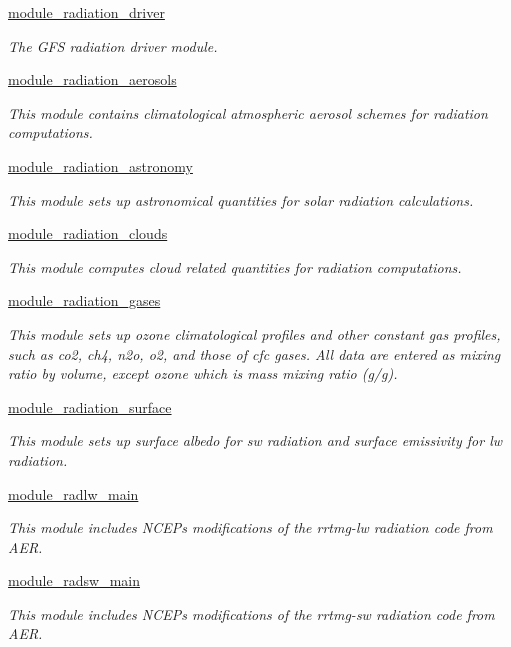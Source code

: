 \begin{DoxyCompactItemize}
\item 
\hyperlink{group__module__radiation__driver}{module\+\_\+radiation\+\_\+driver}
\begin{DoxyCompactList}\small\item\em The G\+FS radiation driver module. \end{DoxyCompactList}\item 
\hyperlink{group__module__radiation__aerosols}{module\+\_\+radiation\+\_\+aerosols}
\begin{DoxyCompactList}\small\item\em This module contains climatological atmospheric aerosol schemes for radiation computations. \end{DoxyCompactList}\item 
\hyperlink{group__module__radiation__astronomy}{module\+\_\+radiation\+\_\+astronomy}
\begin{DoxyCompactList}\small\item\em This module sets up astronomical quantities for solar radiation calculations. \end{DoxyCompactList}\item 
\hyperlink{group__module__radiation__clouds}{module\+\_\+radiation\+\_\+clouds}
\begin{DoxyCompactList}\small\item\em This module computes cloud related quantities for radiation computations. \end{DoxyCompactList}\item 
\hyperlink{group__module__radiation__gases}{module\+\_\+radiation\+\_\+gases}
\begin{DoxyCompactList}\small\item\em This module sets up ozone climatological profiles and other constant gas profiles, such as co2, ch4, n2o, o2, and those of cfc gases. All data are entered as mixing ratio by volume, except ozone which is mass mixing ratio (g/g). \end{DoxyCompactList}\item 
\hyperlink{group__module__radiation__surface}{module\+\_\+radiation\+\_\+surface}
\begin{DoxyCompactList}\small\item\em This module sets up surface albedo for sw radiation and surface emissivity for lw radiation. \end{DoxyCompactList}\item 
\hyperlink{group__module__radlw__main}{module\+\_\+radlw\+\_\+main}
\begin{DoxyCompactList}\small\item\em This module includes N\+C\+EP\textquotesingle{}s modifications of the rrtmg-\/lw radiation code from A\+ER. \end{DoxyCompactList}\item 
\hyperlink{group__module__radsw__main}{module\+\_\+radsw\+\_\+main}
\begin{DoxyCompactList}\small\item\em This module includes N\+C\+EP\textquotesingle{}s modifications of the rrtmg-\/sw radiation code from A\+ER. \end{DoxyCompactList}\end{DoxyCompactItemize}
